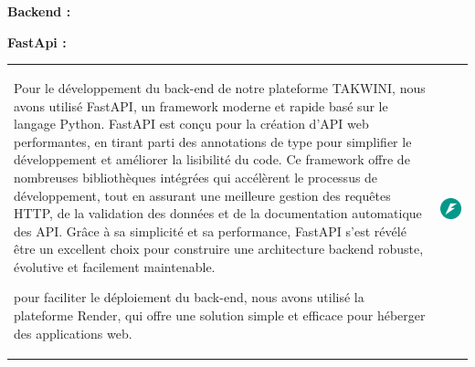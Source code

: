 \documentclass{article}
\begin{document}
\vspace{0,3cm}

\noindent \large \textbf{Backend :}

\vspace{0,5cm}
\newpage

\noindent \large \textbf{FastApi \cite{FastApi}:}

\vspace{0,3cm}

\noindent
\begin{tabular}
{@{}m{}@{\hspace{1em}}m{}@{}}
Pour le développement du back-end de notre plateforme TAKWINI, nous avons utilisé FastAPI, un framework moderne et rapide basé sur le langage Python. FastAPI est conçu pour la création d'API web performantes, en tirant parti des annotations de type pour simplifier le développement et améliorer la lisibilité du code. Ce framework offre de nombreuses bibliothèques intégrées qui accélèrent le processus de développement, tout en assurant une meilleure gestion des requêtes HTTP, de la validation des données et de la documentation automatique des API. Grâce à sa simplicité et sa performance, FastAPI s’est révélé être un excellent choix pour construire une architecture backend robuste, évolutive et facilement maintenable.

\vspace{0,2cm}

\hspace{0,2cm}pour faciliter le déploiement du back-end, nous avons utilisé la plateforme Render, qui offre une solution simple et efficace pour héberger des applications web.
&
\includegraphics[width=\linewidth]{fastapi.png} %
\end{tabular}
\end{document}
